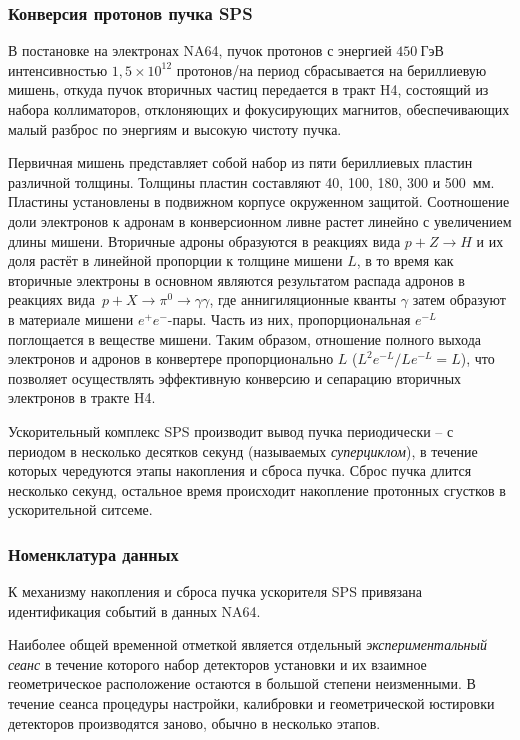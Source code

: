 \subsubsection{Конверсия протонов пучка SPS}

В постановке на электронах NA64, пучок протонов с энергией $450~\text{ГэВ}$
интенсивностью $1{,}5 \times 10^{12}$ протонов/на период сбрасывается
на бериллиевую мишень, откуда пучок вторичных частиц передается в
тракт H4, состоящий из набора коллиматоров, отклоняющих и фокусирующих
магнитов, обеспечивающих малый разброс по энергиям и высокую чистоту пучка.

Первичная мишень представляет собой набор из пяти бериллиевых пластин
различной толщины. Толщины пластин составляют 40, 100, 180, 300 и 500~мм.
Пластины установлены в подвижном корпусе окруженном защитой. Соотношение
доли электронов к адронам в конверсионном ливне растет линейно с
увеличением длины мишени. Вторичные адроны образуются в реакциях вида
$p + Z \rightarrow H$ и их доля растёт в линейной пропорции к толщине
мишени $L$, в то время как вторичные электроны в основном являются результатом
распада адронов в реакциях
вида~$p + X \rightarrow \pi^0 \rightarrow \gamma \gamma$, где
аннигиляционные кванты $\gamma$ затем образуют в материале мишени
$e^{+}e^{-}$-пары. Часть из них, пропорциональная $e^{-L}$ поглощается
в веществе мишени. Таким образом, отношение полного выхода электронов и
адронов в конвертере пропорционально $L$ ($L^2 e^{-L}/L e^{-L} = L$),
что позволяет осуществлять эффективную конверсию и сепарацию вторичных
электронов в тракте H4.

Ускорительный комплекс SPS производит вывод пучка периодически --
с периодом в несколько десятков секунд (называемых \emph{суперциклом}),
в течение которых чередуются этапы накопления и сброса пучка.
Сброс пучка длится несколько секунд, остальное время происходит
накопление протонных сгустков в ускорительной ситсеме.

\subsubsection{Номенклатура данных}

К механизму накопления и сброса пучка ускорителя SPS привязана
идентификация событий в данных NA64.

Наиболее общей временной отметкой является отдельный
\emph{экспериментальный сеанс} в течение которого набор
детекторов установки и их взаимное геометрическое расположение
остаются в большой степени неизменными. В течение сеанса
процедуры настройки, калибровки и геометрической юстировки
детекторов производятся заново, обычно в несколько этапов.

